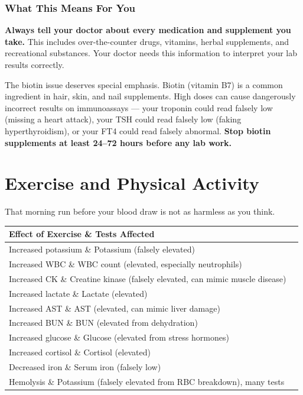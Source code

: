 \subsubsection{What This Means For You}

\textbf{Always tell your doctor about every medication and supplement you take.} This includes over-the-counter drugs, vitamins, herbal supplements, and recreational substances. Your doctor needs this information to interpret your lab results correctly.

The biotin issue deserves special emphasis. Biotin (vitamin B7) is a common ingredient in hair, skin, and nail supplements. High doses can cause dangerously incorrect results on immunoassays --- your troponin could read falsely low (missing a heart attack), your TSH could read falsely low (faking hyperthyroidism), or your FT4 could read falsely abnormal. \textbf{Stop biotin supplements at least 24--72 hours before any lab work.}

\clearpage
\section{Exercise and Physical Activity}

That morning run before your blood draw is not as harmless as you think.

\begin{longtable}{@{}ll@{}}
\toprule
\textbf{Effect of Exercise} \& \textbf{Tests Affected} \\
\midrule
Increased potassium \& Potassium (falsely elevated) \\
Increased WBC \& WBC count (elevated, especially neutrophils) \\
Increased CK \& Creatine kinase (falsely elevated, can mimic muscle disease) \\
Increased lactate \& Lactate (elevated) \\
Increased AST \& AST (elevated, can mimic liver damage) \\
Increased BUN \& BUN (elevated from dehydration) \\
Increased glucose \& Glucose (elevated from stress hormones) \\
Increased cortisol \& Cortisol (elevated) \\
Decreased iron \& Serum iron (falsely low) \\
Hemolysis \& Potassium (falsely elevated from RBC breakdown), many tests \\
\bottomrule
\end{longtable}

